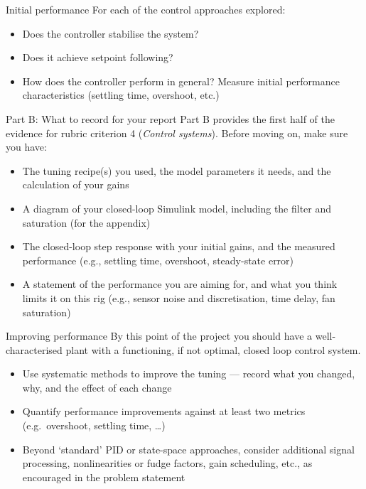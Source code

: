\documentclass[9pt]{beamer-control}
\begin{document}
\begin{frame}{Initial performance}
  For each of the control approaches explored:
  \begin{itemize}
    \item Does the controller stabilise the system?
    \item Does it achieve setpoint following?
    \item How does the controller perform in general? Measure initial performance characteristics (settling time, overshoot, etc.)
  \end{itemize}
\end{frame}


\begin{frame}{Part B: What to record for your report}
  Part B provides the first half of the evidence for rubric criterion 4 (\emph{Control systems}). Before moving on, make sure you have:
  \begin{itemize}
    \item The tuning recipe(s) you used, the model parameters it needs, and the calculation of your gains
    \item A diagram of your closed-loop Simulink model, including the filter and saturation (for the appendix)
    \item The closed-loop step response with your initial gains, and the measured performance (e.g., settling time, overshoot, steady-state error)
    \item A statement of the performance you are aiming for, and what you think limits it on this rig (e.g., sensor noise and discretisation, time delay, fan saturation)
  \end{itemize}
\end{frame}



\begin{frame}{Improving performance}
  By this point of the project you should have a well-characterised plant with a functioning, if not optimal, closed loop control system.
  \begin{itemize}
    \item Use systematic methods to improve the tuning --- record what you changed, why, and the effect of each change
    \item Quantify performance improvements against at least two metrics (e.g.\ overshoot, settling time, \dots)
    \item Beyond `standard' PID or state-space approaches, consider additional signal processing, nonlinearities or fudge factors, gain scheduling, etc., as encouraged in the problem statement
  \end{itemize}
\end{frame}
\end{document}
